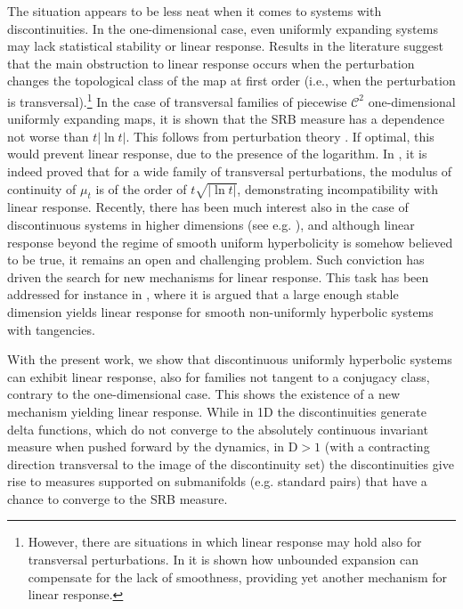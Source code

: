 \documentclass{amsart}
\numberwithin{equation}{section}
\newcommand\cC{{\mathcal C}}
\begin{document}
The situation appears to be less neat when it comes to systems with discontinuities. In the one-dimensional case, even uniformly expanding systems may lack statistical stability or linear response. Results in the literature \cite{Baladi07,BS08,LS18} suggest that the main obstruction to linear response occurs when the perturbation changes the topological class of the map at first order (i.e., when the perturbation is transversal).\footnote{However, there are situations in which linear response may hold also for transversal perturbations. In \cite{BG24} it is shown how unbounded expansion can compensate for the lack of smoothness, providing yet another mechanism for linear response.} In the case of transversal families of piecewise \(\cC^2\) one-dimensional uniformly expanding maps, it is shown that the SRB measure has a dependence not worse than \(t|\ln t|\). This follows from perturbation theory \cite{Keller82,KL99}. If optimal, this would prevent linear response, due to the presence of the logarithm. In \cite{LS18}, it is indeed proved that for a wide family of transversal perturbations, the modulus of continuity of \(\mu_t\) is of the order of \(t\sqrt{|\ln t|}\), demonstrating incompatibility with linear response. Recently, there has been much interest also in the case of discontinuous systems in higher dimensions (see e.g. \cite{Wormell22, Wormell24}), and although linear response beyond the regime of smooth uniform hyperbolicity is somehow believed to be true, it remains an open and challenging problem. Such conviction has driven the search for new mechanisms for linear response. This task has been addressed for instance in \cite{Ruelle18}, where it is argued that a large enough stable dimension yields linear response for smooth non-uniformly hyperbolic systems with tangencies.

With the present work, we show that discontinuous uniformly hyperbolic systems can exhibit linear response, also for families not tangent to a conjugacy class, contrary to the one-dimensional case. This shows the existence of a new mechanism yielding linear response. While in 1D the discontinuities generate delta functions, which do not converge to the absolutely continuous invariant measure when pushed forward by the dynamics, in D\(>1\) (with a contracting direction transversal to the image of the discontinuity set) the discontinuities give rise to measures supported on submanifolds (e.g. standard pairs) that have a chance to converge to the SRB measure.
\end{document}
